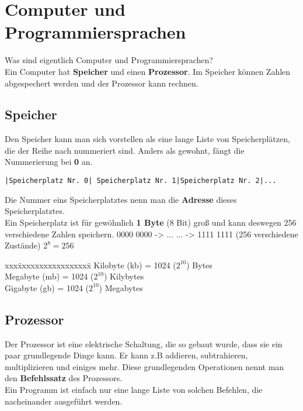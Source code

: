 \documentclass[c_worksheet.tex]{subfiles}
\begin{document}
\chapter{Computer und Programmiersprachen}

Was sind eigentlich Computer und Programmiersprachen? \\
Ein Computer hat \textbf{Speicher} und einen \textbf{Prozessor}. Im Speicher können Zahlen abgespechert werden und der Prozessor kann rechnen. \\

\section{Speicher}

Den Speicher kann man sich vorstellen als eine lange Liste von Speicherplätzen, die der Reihe nach nummeriert sind. Anders als gewohnt, fängt die Nummerierung bei \textbf{0} an. \\

\begin{lstlisting}[numbers=none, style=block]
|Speicherplatz Nr. 0| Speicherplatz Nr. 1|Speicherplatz Nr. 2|...
\end{lstlisting}

\vspace{3pt}
Die Nummer eins Speicherplatztes nenn man die \textbf{Adresse} dieses Speicherplatztes. \\
Ein Speicherplatz ist für gewöhnlich \textbf{1 Byte} (8 Bit) groß und kann deswegen 256 verschiedene Zahlen speichern.
0000 0000 -> ...  ... -> 1111 1111 (256 verschiedene Zustände) $2^8 = 256$ \\

\begin{tabbing}
xxx\=xxxxxxxxxxxxxxxxx\=  \kill
{} Kilobyte (kb) \>= 1024 ($2^{10}$) Bytes\\
 Megabyte (mb) \>= 1024 ($2^{10}$) Kilybytes\\
 Gigabyte (gb) \>= 1024 ($2^{10}$) Megabytes\\
\end{tabbing}

\section{Prozessor}

Der Prozessor ist eine elektrische Schaltung, die so gebaut wurde, dass sie ein paar grundlegende Dinge kann.
Er kann z.B addieren, subtrahieren, multiplizieren und einiges mehr. Diese grundlegenden Operationen nennt man den \textbf{Befehlssatz} des Prozessors.\\
Ein Programm ist einfach nur eine lange Liste von solchen Befehlen, die nacheinander ausgeführt werden. \\
\end{document}
